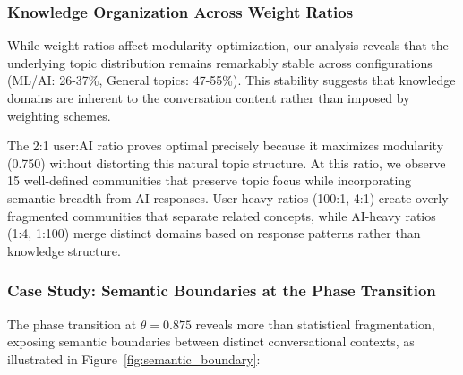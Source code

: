 \documentclass{svproc}
\begin{document}
\subsubsection{Knowledge Organization Across Weight Ratios}

While weight ratios affect modularity optimization, our analysis reveals that the underlying topic distribution remains remarkably stable across configurations (ML/AI: 26-37\%, General topics: 47-55\%). This stability suggests that knowledge domains are inherent to the conversation content rather than imposed by weighting schemes. 

The 2:1 user:AI ratio proves optimal precisely because it maximizes modularity (0.750) without distorting this natural topic structure. At this ratio, we observe 15 well-defined communities that preserve topic focus while incorporating semantic breadth from AI responses. User-heavy ratios (100:1, 4:1) create overly fragmented communities that separate related concepts, while AI-heavy ratios (1:4, 1:100) merge distinct domains based on response patterns rather than knowledge structure.

\subsubsection{Case Study: Semantic Boundaries at the Phase Transition}

The phase transition at $\theta = 0.875$ reveals more than statistical fragmentation, exposing semantic boundaries between distinct conversational contexts, as illustrated in Figure~\ref{fig:semantic_boundary}:
\end{document}
